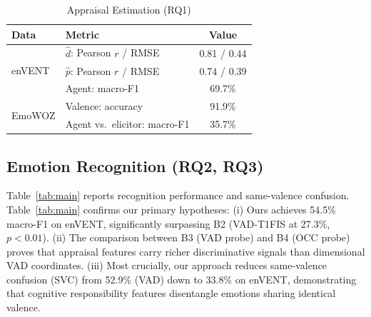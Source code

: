 \documentclass[conference, a4paper]{IEEEtran}
\begin{document}
\begin{table}[t]
\centering
\caption{Appraisal Estimation (RQ1)}
\label{tab:rq1}
\footnotesize
\begin{tabular}{@{}llc@{}}
\toprule
Data & Metric & Value \\
\midrule
\multirow{3}{*}{enVENT} & $\hat d$: Pearson $r$ / RMSE & 0.81 / 0.44 \\
 & $\hat p$: Pearson $r$ / RMSE & 0.74 / 0.39 \\
 & Agent: macro-F1 & 69.7\% \\
\midrule
\multirow{2}{*}{EmoWOZ} & Valence: accuracy & 91.9\% \\
 & Agent vs.\ elicitor: macro-F1 & 35.7\% \\
\bottomrule
\end{tabular}
\end{table}

\subsection{Emotion Recognition (RQ2, RQ3)}
Table~\ref{tab:main} reports recognition performance and same-valence confusion. Table~\ref{tab:main} confirms our primary hypotheses: (i) Ours achieves 54.5\% macro-F1 on enVENT, significantly surpassing B2 (VAD-T1FIS at 27.3\%, $p < 0.01$). (ii) The comparison between B3 (VAD probe) and B4 (OCC probe) proves that appraisal features carry richer discriminative signals than dimensional VAD coordinates. (iii) Most crucially, our approach reduces same-valence confusion (SVC) from 52.9\% (VAD) down to 33.8\% on enVENT, demonstrating that cognitive responsibility features disentangle emotions sharing identical valence.
\end{document}
